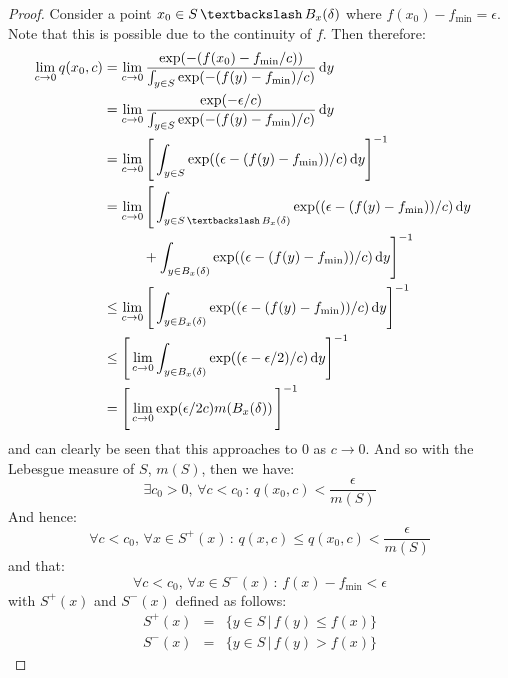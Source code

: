 \begin{theorem}
\begin{proof}
\noindent Consider a point $x_0 \in S \, \textbackslash \, B_x(\delta)$ where $f(x_0) - f_{\min} = \epsilon$. Note that this is possible due to the continuity of $f$. Then therefore:
\begin{align}
    \lim_{c \rightarrow 0} q(x_0, c) & = \lim_{c \rightarrow 0} \dfrac{\exp(-(f(x_0)-f_{\min}/c))}{\int_{y \in S} \exp(-(f(y)-f_{\min})/c)} \, \dd y & \notag \\
    & = \lim_{c \rightarrow 0} \dfrac{\exp(-\epsilon/c)}{\int_{y \in S} \exp(-(f(y)-f_{\min})/c)} \, \dd y & \notag \\
    & = \lim_{c \rightarrow 0} \Bigg[ \int_{y \in S} \exp((\epsilon-(f(y)-f_{\min}))/c) \, \dd y \Bigg]^{-1} & \notag \\
    & = \lim_{c \rightarrow 0} \Bigg[ \int_{y \in S \, \textbackslash \, B_x(\delta)} \exp((\epsilon-(f(y)-f_{\min}))/c) \, \dd y  & \notag \\
    & \hspace{10mm} + \int_{y \in B_x(\delta)} \exp((\epsilon-(f(y)-f_{\min}))/c) \, \dd y  \Bigg]^{-1} & \notag \\
    & \leq \lim_{c \rightarrow 0} \Bigg[ \int_{y \in B_x(\delta)} \exp((\epsilon-(f(y)-f_{\min}))/c) \, \dd y  \Bigg]^{-1} & \notag \\
    & \leq \Bigg[ \lim_{c \rightarrow 0}  \int_{y \in B_x(\delta)} \exp((\epsilon-\epsilon/2)/c) \, \dd y  \Bigg]^{-1} & \notag \\
    & = \Bigg[ \lim_{c \rightarrow 0}   \exp(\epsilon/2c)m(B_x(\delta)) \,  \Bigg]^{-1} &
\end{align}
and can clearly be seen that this approaches to 0 as $c \rightarrow 0$. And so with the Lebesgue measure of $S$, $m(S)$, then we have:
\begin{equation}
    \exists c_0 > 0, \, \forall c < c_0 \, : \, q(x_0, c) < \dfrac{\epsilon}{m(S)}
\end{equation}
And hence:
\begin{equation}
   \forall c < c_0, \, \forall x \in S^+ (x) \, : \, q(x,c) \leq q(x_0, c) < \dfrac{\epsilon}{m(S)}
\end{equation}
and that:
\begin{equation}
    \forall c < c_0, \, \forall x \in S^- (x) \, : \, f(x) - f_{\min} < \epsilon
\end{equation}
with $S^+(x)$ and $S^-(x)$ defined as follows:
\begin{eqnarray}
    S^+(x) & = & \{ y \in S \, | \, f(y) \leq f(x) \} \\
    S^-(x) & = & \{ y \in S \, | \, f(y) > f(x) \} 

\end{eqnarray}
\end{proof}
\end{theorem}
